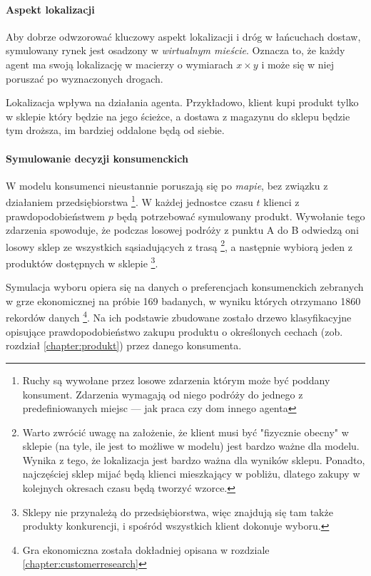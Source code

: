 \documentclass[polish, twoside, 12pt, a4paper]{article}
\theoremstyle{definition}
\theoremstyle{plain}
\theoremstyle{remark}
\begin{document}
\paragraph{Aspekt lokalizacji}

Aby dobrze odwzorować kluczowy aspekt lokalizacji i dróg w łańcuchach dostaw, symulowany rynek jest osadzony w \textit{wirtualnym mieście}. Oznacza to, że każdy agent ma swoją lokalizację w macierzy o wymiarach $x \times y$ i może się w niej poruszać po wyznaczonych drogach.

Lokalizacja wpływa na działania agenta. Przykładowo, klient kupi produkt tylko w sklepie który będzie na jego ścieżce, a dostawa z magazynu do sklepu będzie tym droższa, im bardziej oddalone będą od siebie. 

\paragraph{Symulowanie decyzji konsumenckich}

W modelu konsumenci nieustannie poruszają się po \textit{mapie}, bez związku z działaniem przedsiębiorstwa \footnote{Ruchy są wywołane przez losowe zdarzenia którym może być poddany konsument. Zdarzenia wymagają od niego podróży do jednego z predefiniowanych miejsc --- jak praca czy dom innego agenta}. W każdej jednostce czasu $ t $ klienci z prawdopodobieństwem $ p $ będą potrzebować symulowany produkt. Wywołanie tego zdarzenia spowoduje, że podczas losowej podróży z punktu A do B odwiedzą oni losowy sklep ze wszystkich sąsiadujących z trasą \footnote{Warto zwrócić uwagę na założenie, że klient musi być "fizycznie obecny" w sklepie (na tyle, ile jest to możliwe w modelu) jest bardzo ważne dla modelu. Wynika z tego, że lokalizacja jest bardzo ważna dla wyników sklepu. Ponadto, najczęściej sklep mijać będą klienci mieszkający w pobliżu, dlatego zakupy w kolejnych okresach czasu będą tworzyć wzorce.}, a następnie wybiorą jeden z produktów dostępnych w sklepie \footnote{Sklepy nie przynależą do przedsiębiorstwa, więc znajdują się tam także produkty konkurencji, i spośród wszystkich klient dokonuje wyboru.}. 

Symulacja wyboru opiera się na danych o preferencjach konsumenckich zebranych w grze ekonomicznej na próbie 169 badanych, w wyniku których otrzymano 1860 rekordów danych \footnote{Gra ekonomiczna została dokładniej opisana w rozdziale \ref{chapter:customerresearch}}. Na ich podstawie zbudowane zostało drzewo klasyfikacyjne opisujące prawdopodobieństwo zakupu produktu o określonych cechach (zob. rozdział \ref{chapter:produkt}) przez danego konsumenta. 
\end{document}
